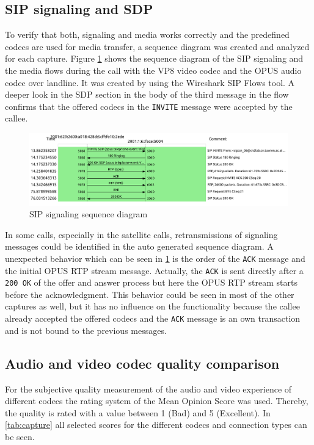 \documentclass[parskip=full]{scrartcl}
\begin{document}
\subsection{SIP signaling and SDP} \label{subsec:signaling}

To verify that both, signaling and media works correctly and the predefined codecs are used for media transfer, a sequence diagram was created and analyzed for each capture.
Figure \ref{fig:sigFlow} shows the sequence diagram of the SIP signaling and the media flows during the call with the VP8 video codec and the OPUS audio codec over landline. 
It was created by using the Wireshark SIP Flows tool. 
A deeper look in the SDP section in the body of the third message in the flow confirms that the offered codecs in the \verb|INVITE| message were accepted by the callee.

\begin{figure}[!ht]
	\centering %
	\includegraphics[width=\textwidth]{images/VP8_OPUS_landline_flow.pdf} %
	\caption{SIP signaling sequence diagram} 
	\label{fig:sigFlow} %
\end{figure} 
In some calls, especially in the satellite calls, retransmissions of signaling messages could be identified in the auto generated sequence diagram. 
A unexpected behavior which can be seen in \cref{fig:sigFlow} is the order of the \verb|ACK| message and the initial OPUS RTP stream message. 
Actually, the \verb|ACK| is sent directly after a \verb|200 OK| of the offer and answer process but here the OPUS RTP stream starts before the acknowledgment.
This behavior could be seen in most of the other captures as well, but it has no influence on the functionality because the callee already accepted the offered codecs and the \verb|ACK| message is an own transaction and is not bound to the previous messages.


\subsection{Audio and video codec quality comparison} \label{subsec:audio}
For the subjective quality measurement of the audio and video experience of different codecs the rating system of the Mean Opinion Score was used.
Thereby, the quality is rated with a value between 1 (Bad) and 5 (Excellent). 
In \cref{tab:capture} all selected scores for the different codecs and connection types can be seen. 
\end{document}
